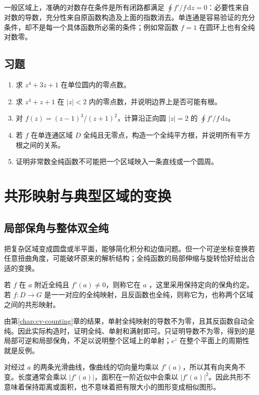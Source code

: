 \documentclass[UTF8,12pt,a4paper,fontset=fandol]{ctexbook}
\begin{document}
一般区域上，准确的对数存在条件是所有闭路都满足 $\oint f'/f\,\mathrm dz=0$：必要性来自对数的导数，充分性来自原函数构造及上面的指数消去。单连通是容易验证的充分条件，却不是每一个具体函数所必需的条件；例如常函数 $f=1$ 在圆环上也有全纯对数零。

\section{习题}
\label{sec:cv-counting-ex}
\begin{enumerate}
 \item 求 $z^4+3z+1$ 在单位圆内的零点数。
 \item 求 $z^4+z+1$ 在 $|z|<2$ 内的零点数，并说明边界上是否可能有根。
 \item 对 $f(z)=(z-1)^3/(z+1)^2$，计算沿正向圆 $|z|=2$ 的 $\oint f'/f\,\mathrm dz$。
 \item 若 $f$ 在单连通区域 $D$ 全纯且无零点，构造一个全纯平方根，并说明所有平方根之间的关系。
 \item 证明非常数全纯函数不可能把一个区域映入一条直线或一个圆周。
\end{enumerate}

\chapter{共形映射与典型区域的变换}
\label{chap:cv-conformal}

\section{局部保角与整体双全纯}

把复杂区域变成圆盘或半平面，能够简化积分和边值问题。但一个可逆坐标变换若任意扭曲角度，可能破坏原来的解析结构；全纯函数的局部伸缩与旋转恰好给出合适的变换。

\begin{definition}[共形与双全纯]
若 $f$ 在 $a$ 附近全纯且 $f'(a)\ne0$，则称它在 $a$ ，这里采用保持定向的保角约定。若 $f:D\to G$ 是一一对应的全纯映射，且反函数也全纯，则称它为，也称两个区域之间的共形映射。
\end{definition}

由第\ref{chap:cv-counting}章的结果，单射全纯映射的导数不为零，且其反函数自动全纯。因此实际构造时，证明全纯、单射和满射即可。只证明导数不为零，得到的是局部可逆和局部保角，不足以说明整个区域上的单射；$e^z$ 在整个平面上的周期性就是反例。

对经过 $a$ 的两条光滑曲线，像曲线的切向量均乘以 $f'(a)$，所以其有向夹角不变。长度通常会乘以 $|f'(a)|$，面积在一阶近似中会乘以 $|f'(a)|^2$。因此共形不意味着保持距离或面积，也不意味着把有限大小的图形变成相似图形。
\end{document}
